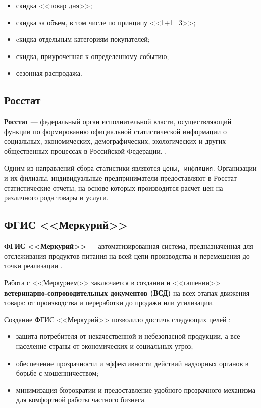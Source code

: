 \begin{itemize}[label*=--]
	\item скидка <<товар дня>>;
	\item скидка за объем, в том числе по принципу <<1+1=3>>;
	\item cкидка отдельным категориям покупателей;
	\item скидка, приуроченная к определенному событию;
	\item сезонная распродажа.
\end{itemize}

\subsection{Росстат}

\textbf{Росстат} ---  федеральный орган исполнительной власти, осуществляющий функции по формированию официальной статистической информации о социальных, экономических, демографических, экологических и других общественных процессах в Российской Федерации. \cite{info_rosstat}.

Одним из направлений сбора статистики являются \texttt{цены, инфляция}. 
Организации и их филиалы, индивидуальные предприниматели предоставляют в Росстат статистические отчеты, на основе которых производится расчет цен на различного рода товары и услуги.

\clearpage

\subsection{ФГИС <<Меркурий>>}

\textbf{ФГИС <<Меркурий>>} --- автоматизированная система, предназначенная для отслеживания продуктов питания на всей цепи производства и перемещения до точки реализации \cite{info_mercury}.

Работа с <<Меркурием>> заключается в создании и <<гашении>> \textbf{ветеринарно-сопроводительных документов (ВСД)} на всех этапах движения товара: от производства и переработки до продажи или утилизации.

Создание ФГИС <<Меркурий>> позволило достичь следующих целей \cite{info_mercury, info_mercury2}:

\begin{itemize}[label=--]
	\item защита потребителя от некачественной и небезопасной продукции, а все население страны от экономических и социальных угроз;
	\item обеспечение прозрачности и эффективности действий надзорных органов в борьбе с мошенничеством;
	\item минимизация бюрократии и предоставление удобного прозрачного механизма для комфортной работы частного бизнеса.
\end{itemize}

